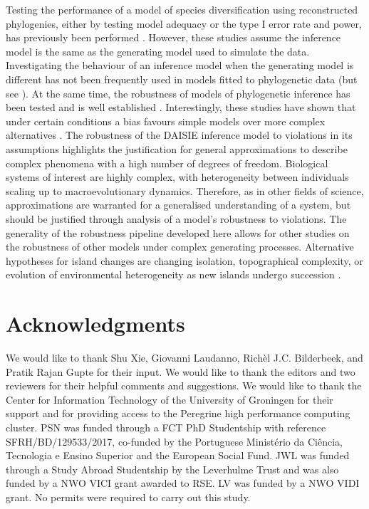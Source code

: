 \documentclass{article}
\begin{document}
Testing the performance of a model of species diversification using reconstructed phylogenies, either by testing model adequacy or the type I error rate and power, has previously been performed \citep{davis_exploring_2013, pennell_model_2015, rabosky_model_2015, etienne_how_2016}. However, these studies assume the inference model is the same as the generating model used to simulate the data. Investigating the behaviour of an inference model when the generating model is different has not been frequently used in models fitted to phylogenetic data (but see \cite{simonet_robustness_2018}). At the same time, the robustness of models of phylogenetic inference has been tested and is well established \citep{huelsenbeck_performance_1995, bilderbeek_quantifying_2021}. Interestingly, these studies have shown that under certain conditions a bias favours simple models over more complex alternatives \citep{yang_how_1997, bruno_topological_1999}. The robustness of the DAISIE inference model to violations in its assumptions highlights the justification for general approximations to describe complex phenomena with a high number of degrees of freedom. Biological systems of interest are highly complex, with heterogeneity between individuals scaling up to macroevolutionary dynamics. Therefore, as in other fields of science, approximations are warranted for a generalised understanding of a system, but should be justified through analysis of a model’s robustness to violations. The generality of the robustness pipeline developed here allows for other studies on the robustness of other models under complex generating processes. Alternative hypotheses for island changes are changing isolation, topographical complexity, or evolution of environmental heterogeneity as new islands undergo succession \citep{massol_island_2017, barajasbarbosa_environmental_2020}.

\section*{Acknowledgments}

We would like to thank Shu Xie, Giovanni Laudanno, Richèl J.C. Bilderbeek, and Pratik Rajan Gupte for their input. We would like to thank the editors and two reviewers for their helpful comments and suggestions. We would like to thank the Center for Information Technology of the University of Groningen for their support and for providing access to the Peregrine high performance computing cluster. PSN was funded through a FCT PhD Studentship with reference SFRH/BD/129533/2017, co-funded by the Portuguese Ministério da Ciência, Tecnologia e Ensino Superior and the European Social Fund. JWL was funded through a Study Abroad Studentship by the Leverhulme Trust and was also funded by a NWO VICI grant awarded to RSE. LV was funded by a NWO VIDI grant. No permits were required to carry out this study.
\end{document}
